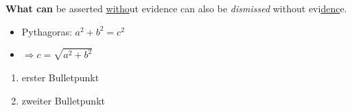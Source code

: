 \documentclass{article}
\begin{document}
\begin{center}
    \textbf{What can} be asserted \underline{witho}ut evidence can also be \textit{dismissed} without evi\underline{denc}e.
\end{center}


\begin{itemize}
    \item Pythagoras: $a^2 + b^2 = c^2$
    \item $\Rightarrow c = \sqrt{a^2 + b^2}$
\end{itemize}


\begin{enumerate}
    \item erster Bulletpunkt
    \item zweiter Bulletpunkt
\end{enumerate}
\end{document}
